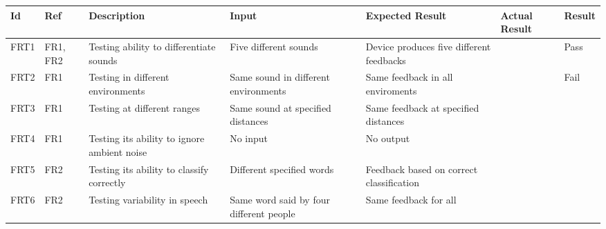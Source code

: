 \documentclass[12pt, titlepage]{article}
\begin{document}
\begin{longtable}{|p{1.1cm}|p{1cm}|p{3cm}|p{1.5cm}|p{2.5cm}|p{2cm}|p{1.2cm}|}
  \hline
  \textbf{Id} & \textbf{Ref} & \textbf{Description}                                                         & \textbf{Input}                                    & \textbf{Expected Result}                                    & \textbf{Actual Result} & \textbf{Result}                                    \\ \hline
  FRT1        & FR1, FR2     & Testing ability to differentiate sounds                                     & Five different sounds                             & Device produces five different feedbacks                    &                        & {\color[HTML]{32CB00} Pass}                        \\ \hline
  FRT2        & FR1          & Testing in different environments                                            & Same sound in different environments              & Same feedback in all enviroments                            &                        & {\color[HTML]{FE0000} Fail}                        \\ \hline
  FRT3        & FR1          & Testing at different ranges                                                  & Same sound at specified distances                 & Same feedback at specified distances                        &                        & \cellcolor[HTML]{FFFFFF}{\color[HTML]{F8A102} TBD} \\ \hline
  FRT4        & FR1          & Testing its ability to ignore ambient noise                                  & No input                                          & No output                                                   &                        &                                                    \\ \hline
  FRT5        & FR2          & Testing its ability to classify correctly                                    & Different specified words                         & Feedback based on correct classification                    &                        &                                                    \\ \hline
  FRT6        & FR2          & Testing variability in speech                                                & Same word said by four different people           & Same feedback for all                                       &                        &                                                    \\ \hline

\end{longtable}
\end{document}
